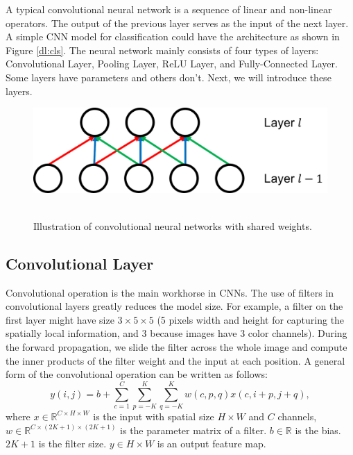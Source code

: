 A typical convolutional neural network is a sequence of linear and non-linear operators. The output of the previous layer serves as the input of the next layer. A simple CNN model for classification could have the architecture as shown in Figure \ref{dl:cls}. The neural network mainly consists of four types of layers: Convolutional Layer, Pooling Layer, ReLU Layer, and Fully-Connected Layer. Some layers have parameters and others don't. Next, we will introduce these layers.


\begin{figure}
\begin{center}
\includegraphics[width=0.7\linewidth]{figures/cnn.pdf} \ \\
\end{center}
\caption{Illustration of convolutional neural networks with shared weights.}
\label{dl:cnn}
\end{figure}


\subsection{Convolutional Layer}
Convolutional operation is the main workhorse in CNNs. The use of filters in convolutional layers greatly reduces the model size. For example, a filter on the first layer might have size $3\times 5\times 5$ (5 pixels width and height for capturing the spatially local information, and 3 because images have 3 color channels). During the forward propagation, we slide the filter across the whole image and compute the inner products of the filter weight and the input at each position. 
A general form of the convolutional operation can be written as follows:
\begin{equation}
  y(i,j) = b + \sum_{c=1}^C \sum_{p=-K}^K \sum_{q=-K}^K w(c,p,q) x(c,i+p,j+q),
\end{equation}
where $x\in\mathbb{R}^{C\times H\times W}$ is the input with spatial size $H \times W$ and $C$ channels, $w\in\mathbb{R}^{C\times (2K+1)\times (2K+1)}$ is the parameter matrix of a filter. $b\in\mathbb{R}$ is the bias. $2K+1$ is the filter size. $y\in{H\times W}$ is an output feature map. 

